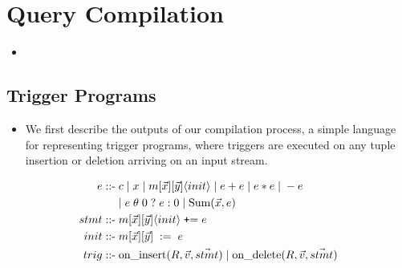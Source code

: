 \section{Query Compilation}

\begin{itemize}
  \item {}
\end{itemize}

\subsection{Trigger Programs}

\begin{itemize}
  \item We first describe the outputs of our compilation process, a simple
  language for representing trigger programs, where triggers are executed on
  any tuple insertion or deletion arriving on an input stream. 
\end{itemize}

\def\mtins{\mbox{on\_insert}}
\def\mtdel{\mbox{on\_delete}}
\begin{align*}
e \; \mbox{::-} & \;
  c \;|\; x \;|\;
  m[\vec{x}][\vec{y}]\tuple{init}
\comment{
  \;|\; e[\vec{w}][\vec{x}] * e[\vec{y}][\vec{z}]
  \;|\; e[\vec{w}][\vec{x}] + e[\vec{y}][\vec{z}]
\\
& 
}
\comment{
  \;|\; e[\vec{w}][\vec{x}] \;\{+,*,-\}\; e[\vec{y}][\vec{z}]
  \;|\; e[\vec{x}][] \;\theta\; 0 \; ? \; e[\vec{y}][\vec{z}] :0
}
  \;|\; e + e \;|\; e * e \;|\; -e
\\
& 
  \;|\; e \;\theta\; 0 \; ? \; e : 0
  \;|\; \calcsum(\vec{x}, e)
\\
stmt \; \mbox{::-} & \; m[\vec{x}][\vec{y}]\tuple{init}
     \; \mbox{{\tt+}=} \; e\\
init \; \mbox{::-} & \; m[\vec{x}][\vec{y}]\comment{\tuple{init}}
     \; := \; e\\
trig \; \mbox{::-} & \; \mtins(R,\vec{v},\vec{stmt}) \;|\;
\mtdel(R,\vec{v},\vec{stmt})
\end{align*}

